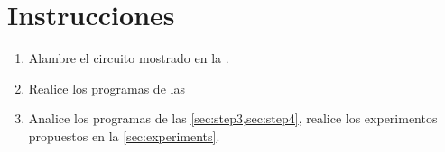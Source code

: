 %
%


\section{Instrucciones}%
\label{sec:instructions}
\begin{enumerate}[noitemsep]
	\item Alambre el circuito mostrado en la .
	\item Realice los programas de las 
 	\item Analice los programas de las \cref{sec:step3,sec:step4}, realice los experimentos propuestos en la \cref{sec:experiments}.
\end{enumerate}





